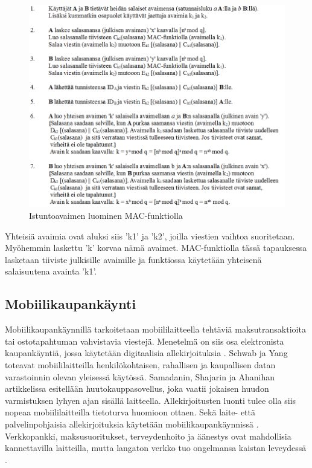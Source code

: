 \documentclass[finnish]{tktltiki2}
\theoremstyle{definition}
\theoremstyle{remark}
\begin{document}
\begin{figure}[h!]
\centering
	\includegraphics[width=\textwidth]{algoritmis}
\caption{Istuntoavaimen luominen MAC-funktiolla \cite{MAC}}
\end{figure}	

Yhteisiä avaimia ovat aluksi siis 'k1' ja 'k2', joilla viestien vaihtoa suoritetaan. Myöhemmin laskettu 'k' korvaa nämä avaimet. MAC-funktiolla tässä tapauksessa lasketaan tiiviste julkisille avaimille ja funktiossa käytetään yhteisenä salaisuutena avainta 'k1'.


\subsection{Mobiilikaupankäynti}

Mobiilikaupankäynnillä tarkoitetaan mobiililaitteella tehtäviä maksutransaktioita tai ostotapahtuman vahvistavia viestejä. Menetelmä on siis osa elektronista kaupankäyntiä, jossa käytetään digitaalisia allekirjoituksia \cite{e-c}. Schwab ja Yang toteavat  \cite{enti} mobiililaitteilla henkilökohtaisen, rahallisen ja kaupallisen datan varastoinnin olevan yleisessä käytössä. Samadanin, Shajarin ja Ahanihan artikkelissa \cite{proxy} esitellään huutokauppasovellus, joka vaatii jokaisen huudon varmistuksen lyhyen ajan sisällä laitteella. Allekirjoitusten luonti tulee olla siis nopeaa mobiililaitteilla tietoturva huomioon ottaen. Sekä laite- että palvelinpohjaisia allekirjoituksia käytetään mobiilikaupankäynnissä \cite{proxy}. Verkkopankki, maksusuoritukset, terveydenhoito ja äänestys ovat mahdollisia kannettavilla laitteilla, mutta langaton verkko tuo ongelmansa kaistan leveydessä \cite{ECC}. 
\end{document}
